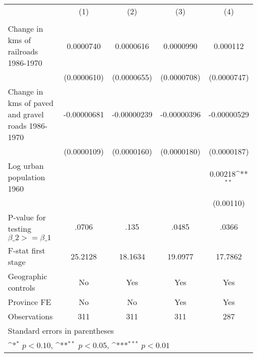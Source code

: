 {
\def\sym#1{\ifmmode^{#1}\else\(^{#1}\)\fi}
\begin{tabular}{l*{4}{c}}
\hline\hline
                &\multicolumn{1}{c}{(1)}&\multicolumn{1}{c}{(2)}&\multicolumn{1}{c}{(3)}&\multicolumn{1}{c}{(4)}\\
                &\multicolumn{1}{c}{}&\multicolumn{1}{c}{}&\multicolumn{1}{c}{}&\multicolumn{1}{c}{}\\
\hline
Change in kms of railroads 1986-1970&0.0000740         &0.0000616         &0.0000990         & 0.000112         \\
                &(0.0000610)         &(0.0000655)         &(0.0000708)         &(0.0000747)         \\
[1em]
Change in kms of paved and gravel roads 1986-1970&-0.00000681         &-0.00000239         &-0.00000396         &-0.00000529         \\
                &(0.0000109)         &(0.0000160)         &(0.0000180)         &(0.0000187)         \\
[1em]
Log urban population 1960&                  &                  &                  &  0.00218\sym{**} \\
                &                  &                  &                  &(0.00110)         \\
\hline
P-value for testing $\beta\_{2} >= \beta\_{1}$&    .0706         &     .135         &    .0485         &    .0366         \\
F-stat first stage&  25.2128         &  18.1634         &  19.0977         &  17.7862         \\
Geographic controls&       No         &      Yes         &      Yes         &      Yes         \\
Province FE     &       No         &       No         &      Yes         &      Yes         \\
Observations    &      311         &      311         &      311         &      287         \\
\hline\hline
\multicolumn{5}{l}{\footnotesize Standard errors in parentheses}\\
\multicolumn{5}{l}{\footnotesize \sym{*} \(p<0.10\), \sym{**} \(p<0.05\), \sym{***} \(p<0.01\)}\\
\end{tabular}
}
